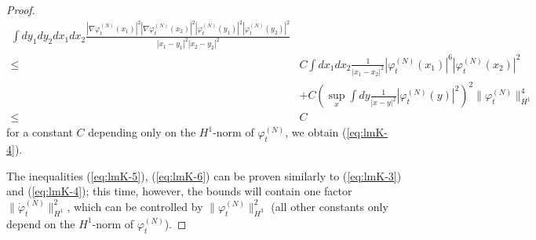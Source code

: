 \documentclass[11pt,a4paper,DIV11]{scrartcl}	%
\begin{document}
\begin{proof}
\[\begin{split}
\int dy_1 dy_2 dx_1 dx_2  \frac{ |\nabla\varphi_t^{(N)} (x_1)|^2 |\nabla \varphi_t^{(N)} (x_2)|^2 
|\varphi_t^{(N)} (y_1)|^2 |\varphi_t^{(N)} (y_2)|^2}{|x_1 - y_1|^2 |x_2 - y_2|^2}  \\ \leq \; &C \int dx_1 dx_2 \frac{1}{|x_1 - x_2|^2} |\varphi_t^{(N)} (x_1)|^6 |\varphi_t^{(N)} (x_2)|^2 \\ &+ C \left( \sup_x \int dy \frac{1}{|x-y|^2} |\varphi_t^{(N)} (y)|^2 \right)^2 \| \varphi_t^{(N)} \|_{H^1}^4 \\ \leq \; & C 
\end{split} \]
for a constant $C$ depending only on the $H^1$-norm of $\varphi_t^{(N)}$, we obtain (\ref{eq:lmK-4}). 

The inequalities (\ref{eq:lmK-5}), (\ref{eq:lmK-6}) can be proven similarly to (\ref{eq:lmK-3}) and (\ref{eq:lmK-4}); this time, however, the bounds will contain one factor $\| \dot{\varphi}_t^{(N)} \|^2_{H^1}$, which can be controlled by $\| \varphi_t^{(N)} \|^2_{H^3}$ (all other constants only depend on the $H^1$-norm of $\varphi_t^{(N)}$).
\end{proof}
\end{document}
